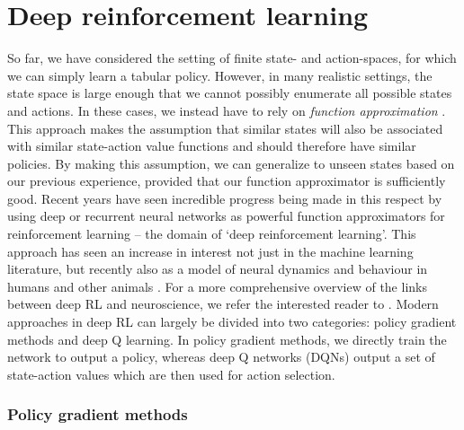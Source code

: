 \section{Deep reinforcement learning}
\label{sec:deep_RL}

So far, we have considered the setting of finite state- and action-spaces, for which we can simply learn a tabular policy.
However, in many realistic settings, the state space is large enough that we cannot possibly enumerate all possible states and actions.
In these cases, we instead have to rely on \emph{function approximation} \citep{sutton2018reinforcement}.
This approach makes the assumption that similar states will also be associated with similar state-action value functions and should therefore have similar policies.
By making this assumption, we can generalize to unseen states based on our previous experience, provided that our function approximator is sufficiently good.
Recent years have seen incredible progress being made in this respect by using deep or recurrent neural networks as powerful function approximators for reinforcement learning -- the domain of `deep reinforcement learning'.
This approach has seen an increase in interest not just in the machine learning literature, but recently also as a model of neural dynamics and behaviour in humans and other animals \citep{wang2018prefrontal, jensen2023recurrent, makino2023arithmetic, merel2019deep, banino2018vector}.
For a more comprehensive overview of the links between deep RL and neuroscience, we refer the interested reader to \citet{botvinick2020deep}.
Modern approaches in deep RL can largely be divided into two categories: policy gradient methods and deep Q learning.
In policy gradient methods, we directly train the network to output a policy, whereas deep Q networks (DQNs) output a set of state-action values which are then used for action selection.

\subsubsection*{Policy gradient methods}

